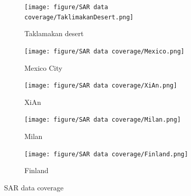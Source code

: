 \documentclass[preprint, authoryear]{elsarticle}
\begin{document}
\begin{figure}
    \centering
    \begin{subfigure}{0.32\textwidth}
        \centering
        \texttt{[image: figure/SAR data coverage/TaklimakanDesert.png]}
        \caption{Taklamakan desert}
        \label{fig_4a}
    \end{subfigure}%
    \begin{subfigure}{0.32\textwidth}
        \centering
        \texttt{[image: figure/SAR data coverage/Mexico.png]}
        \caption{Mexico City}
        \label{fig_4b}
    \end{subfigure}
    \begin{subfigure}{0.32\textwidth}
        \centering
        \texttt{[image: figure/SAR data coverage/XiAn.png]}
        \caption{XiAn}
        \label{fig_4c}
    \end{subfigure}
    \medskip
    \begin{subfigure}{0.32\textwidth}
        \centering
        \texttt{[image: figure/SAR data coverage/Milan.png]}
        \caption{Milan}
        \label{fig_4d}
    \end{subfigure}%
    \begin{subfigure}{0.32\textwidth}
        \centering
        \texttt{[image: figure/SAR data coverage/Finland.png]}
        \caption{Finland}
        \label{fig_4e}
    \end{subfigure}
    \caption{SAR data coverage}
    \label{fig_4}
\end{figure}
\end{document}
